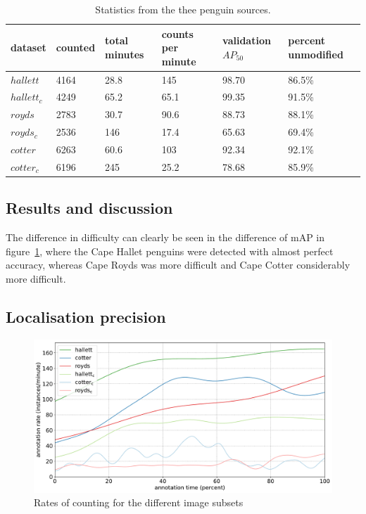 \begin{table}[H]
\label{fig:penguin_statistics}
  \centering
    \caption{Statistics from the thee penguin sources. }
\begin{tabular}{llllll}
dataset     & counted & total minutes & counts per minute & validation $AP_{50}$ & percent unmodified \\
\toprule
$hallett$   & 4164    & 28.8          & 145               & 98.70     & 86.5\%   \\
$hallett_c$ & 4249    & 65.2          & 65.1              & 99.35     & 91.5\%   \\
$royds$     & 2783    & 30.7          & 90.6              & 88.73     & 88.1\%   \\
$royds_c$   & 2536    & 146           & 17.4              & 65.63     & 69.4\%   \\
$cotter$    & 6263    & 60.6          & 103               & 92.34     & 92.1\%   \\
$cotter_c$  & 6196    & 245           & 25.2              & 78.68     & 85.9\%  \\
\bottomrule
\end{tabular}
\end{table}



\subsection{Results and discussion}
 
The difference in difficulty can clearly be seen in the difference of mAP in figure~\ref{fig:penguin_statistics}, where the Cape Hallet penguins were detected with almost perfect accuracy, whereas Cape Royds was more difficult and Cape Cotter considerably more difficult. 

\subsection{ Localisation precision }
\label{sec:localisation_precision}

\begin{figure}[ht]
\centering
\includegraphics[width=1.0\linewidth]{charts/aerial_penguins/summaries/instance_rates.pdf}
\caption{ Rates of counting for the different image subsets }
\label{fig:penguin_rates}
\end{figure}



